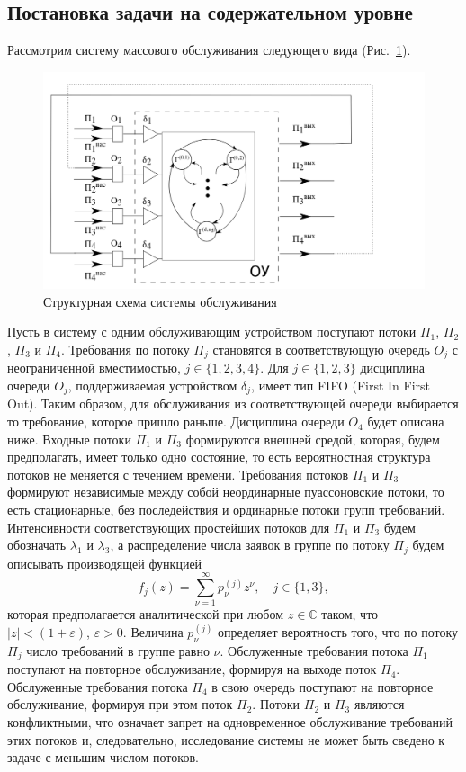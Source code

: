 \documentclass{report}
\begin{document}
\subsection{Постановка задачи на содержательном уровне}
Рассмотрим систему массового обслуживания следующего вида (Рис.~\ref{SystemScheme}).
\begin{figure}[h]
\includegraphics[scale=0.45]{SystemScheme.png} 
\caption{Структурная схема системы обслуживания}
\label{SystemScheme}
\end{figure}
Пусть в систему с одним обслуживающим устройством поступают потоки $\Pi_1$, $\Pi_2$, $\Pi_3$  и $\Pi_4$. Требования по потоку $\Pi_j$ становятся в соответствующую очередь $O_j$ с неограниченной вместимостью, $j\in \{1, 2, 3, 4\}$. Для $j \in \{1, 2, 3\}$ дисциплина очереди $O_j$, поддерживаемая устройством $\delta_j$, имеет тип FIFO (First In First Out). Таким образом, для обслуживания из соответствующей очереди выбирается то требование, которое пришло раньше. Дисциплина очереди $O_4$ будет описана ниже. Входные потоки $\Pi_1$ и $\Pi_3$ формируются внешней средой, которая, будем предполагать, имеет только одно состояние, то есть вероятностная структура потоков не меняется с течением времени. Требования потоков $\Pi_1$ и $\Pi_3$ формируют независимые между собой неординарные пуассоновские потоки, то есть  стационарные, без последействия и ординарные потоки групп требований. Интенсивности соответствующих простейших потоков для $\Pi_1$ и $\Pi_3$ будем обозначать $\lambda_1$ и $\lambda_3$, а распределение числа заявок в группе по потоку $\Pi_j$ будем описывать производящей функцией
\begin{equation}
f_j(z) = \sum_{\nu=1}^{\infty} p_{\nu}^{(j)} z ^{\nu}, \quad j\in \{1,3\},
\label{GeneratingFunc}
\end{equation}
которая предполагается аналитической при любом $z\in \mathbb{C}$ таком, что $|z|<(1+\varepsilon)$, $\varepsilon>0$. Величина $p_{\nu}^{(j)}$ определяет вероятность того, что по потоку $\Pi_j$ число требований в группе равно $\nu$. Обслуженные требования потока $\Pi_1$ поступают на повторное обслуживание, формируя на выходе поток $\Pi_4$. Обслуженные требования потока $\Pi_4$ в свою очередь поступают на повторное обслуживание, формируя при этом поток $\Pi_2$. Потоки $\Pi_2$ и $\Pi_3$ являются конфликтными, что означает запрет на одновременное обслуживание требований этих потоков и, следовательно, исследование системы не может быть сведено к задаче с меньшим числом потоков. 
\end{document}
